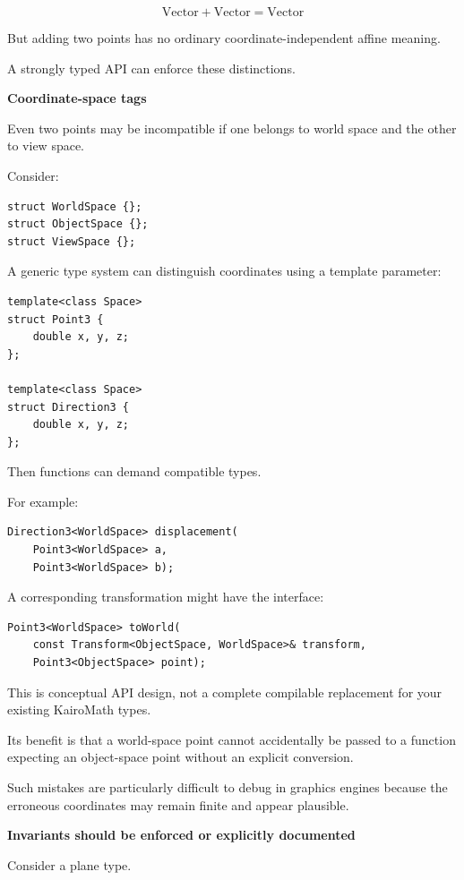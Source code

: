 \[
\text{Vector}+\text{Vector}=\text{Vector}
\]

But adding two points has no ordinary coordinate-independent affine meaning.

A strongly typed API can enforce these distinctions.

\textbf{Coordinate-space tags}

Even two points may be incompatible if one belongs to world space and the other to view space.

Consider:

\begin{verbatim}
struct WorldSpace {};
struct ObjectSpace {};
struct ViewSpace {};
\end{verbatim}

A generic type system can distinguish coordinates using a template parameter:

\begin{verbatim}
template<class Space>
struct Point3 {
    double x, y, z;
};

template<class Space>
struct Direction3 {
    double x, y, z;
};
\end{verbatim}

Then functions can demand compatible types.

For example:

\begin{verbatim}
Direction3<WorldSpace> displacement(
    Point3<WorldSpace> a,
    Point3<WorldSpace> b);
\end{verbatim}

A corresponding transformation might have the interface:

\begin{verbatim}
Point3<WorldSpace> toWorld(
    const Transform<ObjectSpace, WorldSpace>& transform,
    Point3<ObjectSpace> point);
\end{verbatim}

This is conceptual API design, not a complete compilable replacement for your existing KairoMath types.

Its benefit is that a world-space point cannot accidentally be passed to a function expecting an object-space point without an explicit conversion.

Such mistakes are particularly difficult to debug in graphics engines because the erroneous coordinates may remain finite and appear plausible.

\textbf{Invariants should be enforced or explicitly documented}

Consider a plane type.

